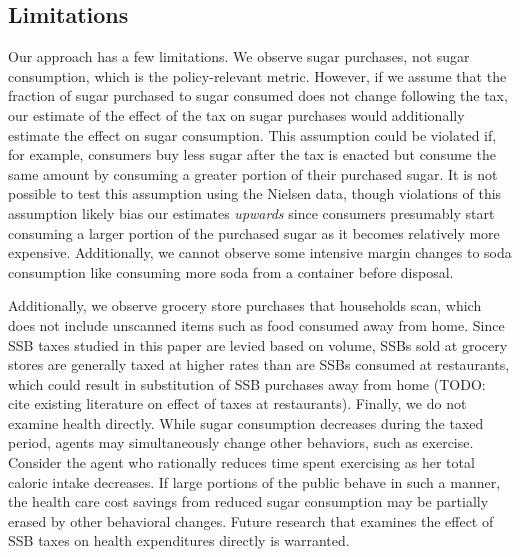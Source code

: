 \documentclass[12pt]{article}
\begin{document}



\subsection{Limitations}

Our approach has a few limitations. We observe sugar purchases, not sugar consumption, which is the policy-relevant metric. However, if we assume that the fraction of sugar purchased to sugar consumed does not change following the tax, our estimate of the effect of the tax on sugar purchases would additionally estimate the effect on sugar consumption. This assumption could be violated if, for example, consumers buy less sugar after the tax is enacted but consume the same amount by consuming a greater portion of their purchased sugar. It is not possible to test this assumption using the Nielsen data, though violations of this assumption likely bias our estimates \textit{upwards} since consumers presumably start consuming a larger portion of the purchased sugar as it becomes relatively more expensive. Additionally, we cannot observe some intensive margin changes to soda consumption like consuming more soda from a container before disposal.

Additionally, we observe grocery store purchases that households scan, which does not include unscanned items such as food consumed away from home. Since SSB taxes studied in this paper are levied based on volume, SSBs sold at grocery stores are generally taxed at higher rates than are SSBs consumed at restaurants, which could result in substitution of SSB purchases away from home (TODO: cite existing literature on effect of taxes at restaurants). Finally, we do not examine health directly. While sugar consumption decreases during the taxed period, agents may simultaneously change other behaviors, such as exercise. Consider the agent who rationally reduces time spent exercising as her total caloric intake decreases. If large portions of the public behave in such a manner, the health care cost savings from reduced sugar consumption may be partially erased by other behavioral changes. Future research that examines the effect of SSB taxes on health expenditures directly is warranted.
\end{document}
